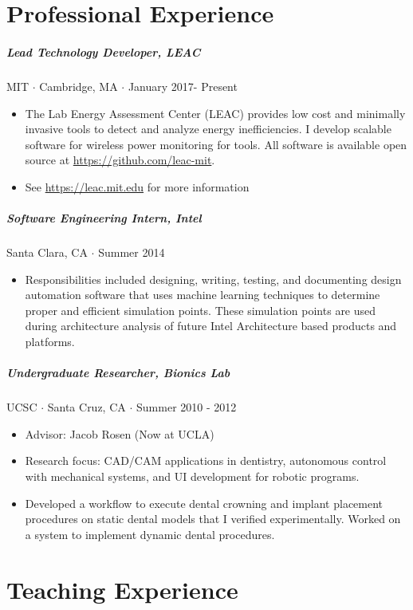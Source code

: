 \documentclass[10pt,letterpaper]{article}
\begin{document}

\nocite{andersICRA18}
\nocite{anders2018juggle}
\nocite{acmp2017}
\nocite{mems17}
\nocite{isec17}
\nocite{ijrr17}
\nocite{apl16}
\nocite{eaai17}
\nocite{rss15}
\nocite{dental}


\section*{Professional Experience}
\subparagraph{Lead Technology Developer, LEAC} MIT $\cdot$ Cambridge, MA $\cdot$ January 2017- Present
\begin{itemize}
    \item The Lab Energy Assessment Center (LEAC) provides low cost and minimally invasive tools to detect and analyze energy inefficiencies. I develop scalable software for wireless power monitoring for tools. All software is available open source at \url{https://github.com/leac-mit}.
\item See \url{https://leac.mit.edu} for more information
\end{itemize}

\subparagraph{Software Engineering Intern, Intel}
Santa Clara, CA $\cdot$ Summer 2014
\begin{itemize}
\item Responsibilities included designing, writing, testing, and documenting design automation software that uses machine learning techniques to determine proper and efficient simulation points. These simulation points are used during architecture analysis of future Intel Architecture based products and platforms.
\end{itemize}

\subparagraph{Undergraduate Researcher, Bionics Lab}
UCSC $\cdot$ Santa Cruz, CA $\cdot$ Summer 2010 - 2012
\begin{itemize}
    \item Advisor: Jacob Rosen (Now at UCLA)
     	\item Research focus: CAD/CAM applications in dentistry, autonomous control with mechanical systems, and UI development for robotic programs.
     	\item  Developed a workflow to execute dental crowning and implant placement procedures on static dental models that I verified experimentally. Worked on a system to implement dynamic dental procedures. 
\end{itemize}


\section*{Teaching Experience}
\end{document}
